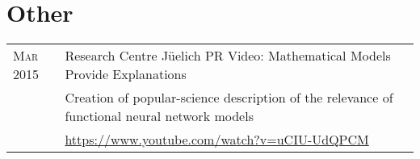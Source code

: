\documentclass[a4paper,10pt]{article}
\begin{document}
\section{Other}
\begin{tabular}{>{\hfill}p{3.15cm}|p{10.4cm}}
  \textsc{Mar} 2015 & Research Centre J\"uelich PR Video: Mathematical Models Provide Explanations \\
                    & \footnotesize Creation of popular-science description of the relevance of functional neural network models \\
                    & \footnotesize \href{https://www.youtube.com/watch?v=uCIU-UdQPCM}{https://www.youtube.com/watch?v=uCIU-UdQPCM}
\end{tabular}

\newpage

\newif\ifpublications
\publicationstrue

\ifpublications

\fi
\end{document}
